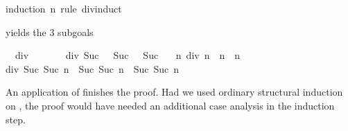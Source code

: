 \begin{isabellebody}
%
\isadelimproof
%
\endisadelimproof
%
\isatagproof
{}\isamarkupfalse%
{}induction\ n\ rule{}\ div{}{}induct{}%
\begin{isamarkuptxt}%
yields the 3 subgoals
\begin{isabelle}%
\ {}{}\ div{}\ {}{}\ {}\ {}{}\ {}\ {}\isanewline
\ {}{}\ div{}\ {}Suc\ {}\ {}\ Suc\ {}{}\ {}\ Suc\ {}\isanewline
\ {}{}\ {}n{}\ div{}\ {}n\ {}\ n{}\ {}\ n\ {}\isanewline
{}div{}\ {}Suc\ {}Suc\ n{}\ {}\ Suc\ {}Suc\ n{}{}\ {}\ Suc\ {}Suc\ n{}%
\end{isabelle}
An application of  finishes the proof.
Had we used ordinary structural induction on ,
the proof would have needed an additional
case analysis in the induction step.


\end{isamarkuptxt}
\end{isabellebody}
